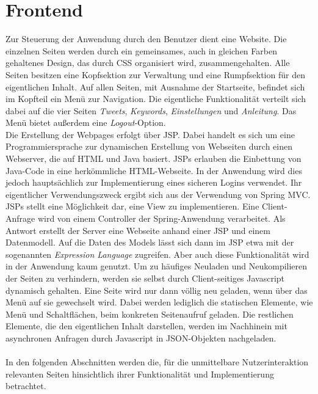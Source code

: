 \section{Frontend} 
\label{sec:frontend}
Zur Steuerung der Anwendung durch den Benutzer dient eine Website. Die einzelnen Seiten werden durch ein gemeinsames, auch in gleichen Farben gehaltenes Design, das durch CSS organisiert wird, zusammengehalten. Alle Seiten besitzen eine Kopfsektion zur Verwaltung und eine Rumpfsektion für den eigentlichen Inhalt. Auf allen Seiten, mit Ausnahme der Startseite, befindet sich im Kopfteil ein Menü zur Navigation.  Die eigentliche Funktionalität verteilt sich dabei auf die vier Seiten \textit{Tweets}, \textit{Keywords}, \textit{Einstellungen} und \textit{Anleitung}. Das Menü bietet außerdem eine \textit{Logout}-Option. \\
Die Erstellung der Webpages erfolgt über \ac{JSP}. Dabei handelt es sich um eine Programmiersprache zur dynamischen Erstellung von Webseiten durch einen Webserver, die auf HTML und Java basiert. JSPs erlauben die Einbettung von Java-Code in eine herkömmliche HTML-Webseite. In der Anwendung wird dies jedoch hauptsächlich zur Implementierung eines sicheren Logins verwendet. Ihr eigentlicher Verwendungszweck ergibt sich aus der Verwendung von Spring MVC. \acs{JSP}s stellt eine Möglichkeit dar, eine View zu implementieren. Eine Client-Anfrage wird von einem Controller der Spring-Anwendung verarbeitet. Als Antwort erstellt der Server eine Webseite anhand einer JSP und einem Datenmodell. Auf die Daten des Models lässt sich dann im JSP etwa mit der sogenannten \textit{Expression Language} zugreifen. Aber auch diese Funktionalität wird in der Anwendung kaum genutzt. Um zu häufiges Neuladen und Neukompilieren der Seiten zu verhindern, werden sie selbst durch Client-seitiges Javascript dynamisch gehalten. Eine Seite wird nur dann völlig neu geladen, wenn über das Menü auf sie gewechselt wird. Dabei werden lediglich die statischen Elemente, wie Menü und Schaltflächen, beim konkreten Seitenaufruf geladen. Die restlichen Elemente, die den eigentlichen Inhalt darstellen, werden im Nachhinein mit asynchronen Anfragen durch Javascript in JSON-Objekten nachgeladen. \\\\
%
In den folgenden Abschnitten werden die, für die unmittelbare Nutzerinteraktion relevanten Seiten hinsichtlich ihrer Funktionalität und Implementierung betrachtet. 
%

